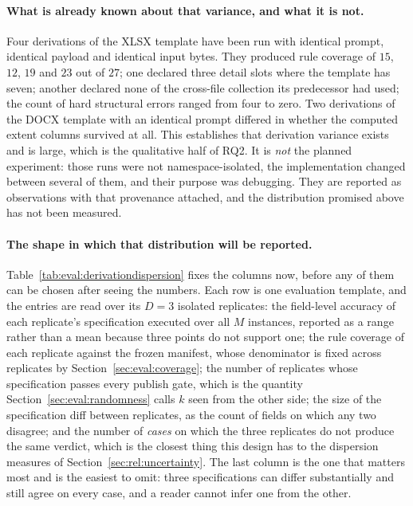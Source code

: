 \paragraph{What is already known about that variance, and what it is not.}
Four derivations of the XLSX template have been run with identical prompt, identical payload
and identical input bytes. They produced rule coverage of $15$, $12$, $19$ and $23$ out of
$27$; one declared three detail slots where the template has seven; another declared none of
the cross-file collection its predecessor had used; the count of hard structural errors ranged
from four to zero. Two derivations of the DOCX template with an identical prompt differed in
whether the computed extent columns survived at all. This establishes that derivation variance
exists and is large, which is the qualitative half of RQ2. It is \emph{not} the planned
experiment: those runs were not namespace-isolated, the implementation changed between several
of them, and their purpose was debugging. They are reported as observations with that
provenance attached, and the distribution promised above has not been measured.

\paragraph{The shape in which that distribution will be reported.}
Table~\ref{tab:eval:derivationdispersion} fixes the columns now, before any of them can be
chosen after seeing the numbers. Each row is one evaluation template, and the entries are read
over its $D=3$ isolated replicates: the field-level accuracy of each replicate's specification
executed over all $M$ instances, reported as a range rather than a mean because three points do
not support one; the rule coverage of each replicate against the frozen manifest, whose
denominator is fixed across replicates by Section~\ref{sec:eval:coverage}; the number of
replicates whose specification passes every publish gate, which is the quantity
Section~\ref{sec:eval:randomness} calls $k$ seen from the other side; the size of the
specification diff between replicates, as the count of fields on which any two disagree; and
the number of \emph{cases} on which the three replicates do not produce the same verdict, which
is the closest thing this design has to the dispersion measures of
Section~\ref{sec:rel:uncertainty}. The last column is the one that matters most and is the
easiest to omit: three specifications can differ substantially and still agree on every case,
and a reader cannot infer one from the other.

